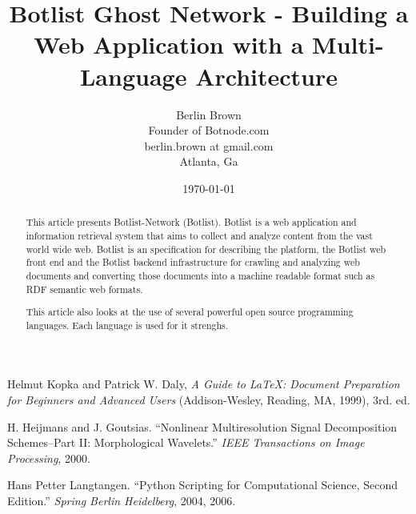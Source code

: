 \documentclass[12pt]{report}
\begin{document}
\title{Botlist Ghost Network - Building a Web Application with a Multi-Language Architecture}

\author{Berlin Brown\\
  Founder of Botnode.com\\
  berlin.brown at gmail.com\\
  Atlanta, Ga\\
  \date{\today}}

\maketitle


\begin{abstract}
This article presents Botlist-Network (Botlist).  Botlist is a 
web application and information retrieval system that aims to collect
and analyze content from the vast world wide web.  Botlist is an specification
for describing the platform, the Botlist web front end and the Botlist backend
infrastructure for crawling and analyzing web documents and converting those
documents into a machine readable format such as RDF semantic web formats.

This article also looks at the use of several powerful open source programming
languages.  Each language is used for it strenghs.
\end{abstract}

\tableofcontents












\begin{thebibliography}{99}

Helmut Kopka and Patrick W. Daly, \textsl{A Guide to
\LaTeX: Document Preparation for Beginners and Advanced Users} (Addison-Wesley, Reading, MA, 1999), 3rd. ed.

H. Heijmans and J. Goutsias. 
  ``Nonlinear Multiresolution Signal Decomposition Schemes--Part II: Morphological Wavelets.'' 
   \textsl{IEEE Transactions on Image Processing}, 2000.

Hans Petter Langtangen.
  ``Python Scripting for Computational Science, Second Edition.''
  \textsl{Spring Berlin Heidelberg}, 2004, 2006.

\end{thebibliography}
\end{document}
